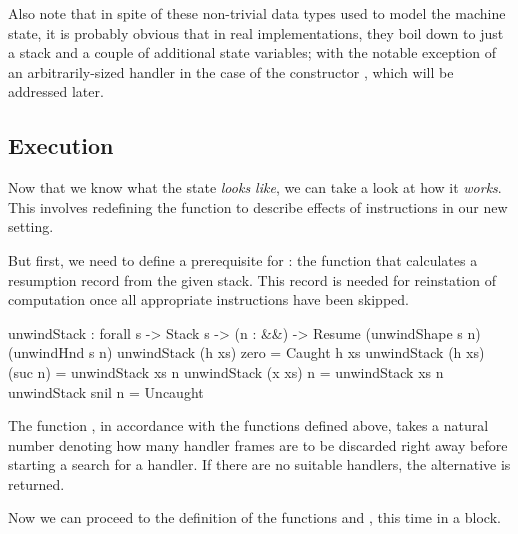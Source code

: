 Also note that in spite of these non-trivial data types used to model the
machine state, it is probably obvious that in real implementations, they boil
down to just a stack and a couple of additional state variables; with the
notable exception of an arbitrarily-sized handler in the case of the
constructor , which will be addressed later.

\subsection{Execution}

Now that we know what the state \emph{looks like}, we can take a look at how it \emph{works}.
This involves redefining the function  to describe effects of instructions
in our new setting.

But first, we need to define a prerequisite for : the function
 that calculates a resumption record from the given stack. This record
is needed for reinstation of computation once all appropriate instructions have been skipped.

\label{sec:ham-unwindStack}\begin{code}
  unwindStack : forall {s} -> Stack s -> (n : \bN&\!&)
    -> Resume (unwindShape s n) (unwindHnd s n)
  unwindStack (h \sconsh xs) zero = Caught h xs
  unwindStack (h \sconsh xs) (suc n) = unwindStack xs n
  unwindStack (x \scons xs) n = unwindStack xs n
  unwindStack snil n = Uncaught
\end{code}

\noindent The function , in accordance with the functions
defined above, takes a natural number  denoting how many handler
frames are to be discarded right away before starting a search for a handler.  If
there are no suitable handlers, the alternative  is returned.

Now we can proceed to the definition of the functions  and
, this time in a  block.


